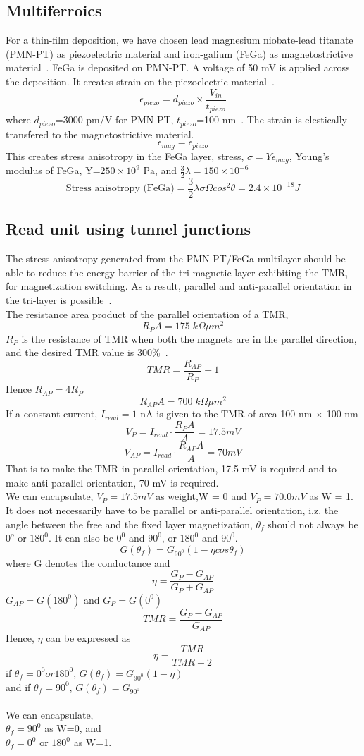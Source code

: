 \documentclass[12pt,a4paper,bold]{thesis}
\theoremstyle{thm}
\theoremstyle{definition}
\begin{document}
\subsection{Multiferroics}
\indent \indent\indent For a thin-film deposition, we have chosen lead magnesium niobate-lead titanate (PMN-PT) as piezoelectric material and iron-galium (FeGa) as magnetostrictive material~\cite{ RefWorks:806}. FeGa is deposited on PMN-PT. A voltage of 50 mV is applied across the deposition. It creates strain on the piezoelectric material~\cite{anton,roy14_6}.
\[\epsilon_{piezo}=d_{piezo}\times \frac{V_{in}}{t_{piezo}}\]
where $d_{piezo}$=3000 pm/V for PMN-PT, $t_{piezo}$=100 nm~\cite{roy_spie_2014}.
The strain is elestically transfered to the magnetostrictive material. 
\[\epsilon_{mag}=\epsilon_{piezo}\] 
This creates stress anisotropy in the FeGa layer, stress, $\sigma=Y\epsilon_{mag}$, Young's modulus of FeGa, Y=$250\times 10^9 \text{ Pa}$, and $\frac{3}{2}\lambda=150\times10^{-6}$
\[\text{Stress anisotropy (FeGa)}=\frac{3}{2}\lambda \sigma \Omega cos^2 \theta=2.4 \times 10^{-18} J\]
\subsection{Read unit using tunnel junctions}
\indent \indent\indent The stress anisotropy generated from the PMN-PT/FeGa multilayer should be able to reduce the energy barrier of the tri-magnetic layer exhibiting the TMR, for magnetization switching. As a result, parallel and anti-parallel orientation in the tri-layer is possible~\cite{kilby}.\\
The resistance area product of the parallel orientation of a TMR,
\[R_PA=175 \; k\Omega \mu m^2\]
$R_P$ is the resistance of TMR when both the magnets are in the parallel direction, and the desired TMR value is 300\%~\cite{RefWorks:33}.
\[TMR=\frac{R_{AP}}{R_P}-1\]
Hence $R_{AP}=4R_P$
\[R_{AP}A=700 \; k\Omega \mu m^2\] 
If a constant current, $I_{read}=1 \text{ nA}$ is given to the TMR of area 100 nm $\times$ 100 nm
\[V_P=I_{read}\cdot \frac{R_PA}{A}=17.5 mV\]
\[V_{AP}=I_{read}\cdot \frac{R_{AP}A}{A}=70 mV\]
That is to make the TMR in parallel orientation, 17.5 mV is required and to make anti-parallel orientation, 70 mV is required.\\
We can encapsulate, $V_P=17.5 mV$ as weight,W = 0 and $V_P=70.0 mV$ as W = 1. It does not necessarily have to be parallel or anti-parallel orientation, i.z. the angle between the free and the fixed layer magnetization, $\theta_f$ should not always be $0^o$ or $180^0$. It can also be $0^0$ and $90^0$, or $180^0$ and $90^0$.
\[G(\theta_f)=G_{90^0}(1-\eta cos \theta_f)\]
where G denotes the conductance and 
\[\eta=\frac{G_P-G_{AP}}{G_P+G_{AP}}\]
$G_{AP}=G(180^0)$ and $G_{P}=G(0^0)$\\
\[TMR=\frac{G_P-G_{AP}}{G_{AP}}\]
Hence, $\eta$ can be expressed as
\[\eta=\frac{TMR}{TMR+2}\]
if $\theta_f=0^0 or 180^0$, $G(\theta_f)=G_{90^0}(1-\eta)$\\
and if $\theta_f=90^0$, $G(\theta_f)=G_{90^0}$\\\\
We can encapsulate,\\$\theta_f=90^0$ as W=0, and\\
$\theta_f=0^0$ or $180^0$ as W=1.
\end{document}
